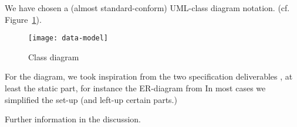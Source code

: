 





We have chosen a (almost standard-conform) UML-class diagram notation.
(cf. Figure~\ref{fig:classdiagram}).


\begin{figure}[htbp]
  \centering
  \texttt{[image: data-model]}
  \caption{Class diagram}
  \label{fig:classdiagram}
\end{figure}

For the diagram, we took inspiration from the two specification
deliverables \cite{coma:spec1} \cite{coma:spec2}, at least the static part,
for instance the ER-diagram from \cite{coma:spec1} In most cases we
simplified the set-up (and left-up certain parts.)


Further information in the discussion.






%


%

